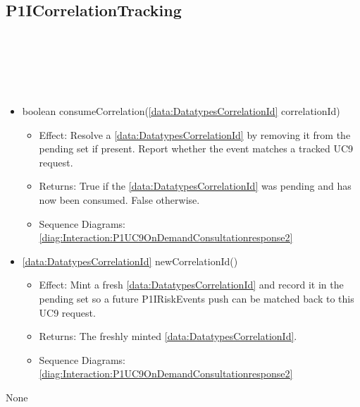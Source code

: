   \subsection{P1ICorrelationTracking}\label{int:InterfacesP1ICorrelationTracking}
    \begin{description}
      \item[Provided by:] \iconcomponent{}~
      \item[Required by:] \iconcomponent{}~ 
      \item[Operations:] ~
    \begin{itemize}[noitemsep,nolistsep,leftmargin=-.25cm]
      \item \textsf{boolean consumeCorrelation(\ref{data:DatatypesCorrelationId} correlationId)}
        \begin{itemize}[noitemsep,nolistsep]
           \item Effect: Resolve a \ref{data:DatatypesCorrelationId} by removing it from the pending set if present. Report whether the event matches a tracked UC9 request. 
           \item Returns: True if the \ref{data:DatatypesCorrelationId} was pending and has now been consumed. False otherwise.
           \item Sequence Diagrams: \cref{diag:Interaction:P1UC9OnDemandConsultationresponse2}
        \end{itemize}
      \item \textsf{\ref{data:DatatypesCorrelationId} newCorrelationId()}
        \begin{itemize}[noitemsep,nolistsep]
           \item Effect: Mint a fresh \ref{data:DatatypesCorrelationId} and record it in the pending set so a future P1IRiskEvents push can be matched back to this UC9 request. 
           \item Returns: The freshly minted \ref{data:DatatypesCorrelationId}.
           \item Sequence Diagrams: \cref{diag:Interaction:P1UC9OnDemandConsultationresponse2}
        \end{itemize}
    \end{itemize}
      \item[Diagrams:] None
    \end{description}


